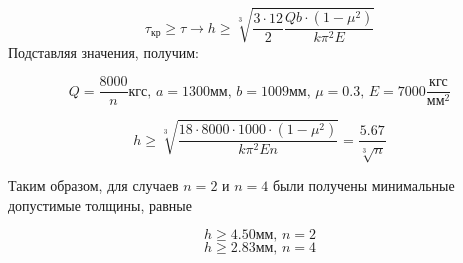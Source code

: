 \begin{equation}
\tau_\text{кр} \geq \tau \to h \geq \sqrt[3]{\frac{3\cdot12}{2}\frac{Qb\cdot(1-\mu^2)}{k\pi^2E}} 
\end{equation}
Подставляя значения, получим:

\begin{equation}
Q=\frac{8000}{n}\text{кгс},\,a=1300\text{мм},\,b=1009\text{мм},\,\mu=0.3,\,E=7000\frac{\text{кгс}}{\text{мм}^2}
\end{equation}

\begin{equation}
h \geq \sqrt[3]{\frac{18\cdot8000\cdot1000\cdot(1-\mu^2)}{k\pi^2En}} = \frac{5.67}{\sqrt[3]{n}} 
\end{equation}

Таким образом, для случаев $n = 2$ и $n = 4$  были получены минимальные допустимые толщины, 
равные

\begin{equation}
h\geq4.50\text{мм},\,n=2
\end{equation}
\begin{equation}
h\geq2.83\text{мм},\,n=4
\end{equation}